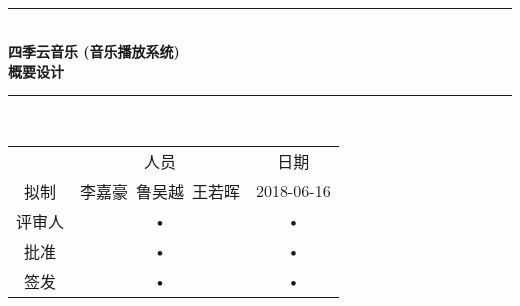 \documentclass[bachelor]{ustcthesis}
\newcommand{\HRule}{\rule{\linewidth}{0.5mm}}
\begin{document}
\begin{titlepage}
\begin{center}
~\\[5cm]
\HRule \\[0.4cm]
{\huge \bfseries 四季云音乐 (音乐播放系统)\\概要设计}\\[0.4cm]
\HRule \\[1.5cm]

\begin{tabular}{ccc}
  & 人员 & 日期 \\ 
拟制 & 李嘉豪\ 鲁吴越\ 王若晖 & 2018-06-16 \\ 
评审人 & • & • \\ 
批准 & • & • \\ 
签发 & • & • \\ 
\end{tabular} 

\end{center}
\end{titlepage}



\frontmatter

\tableofcontents
\listoffigures
\listoftables
% 

\mainmatter











%
%
%
%
%

\end{document}
